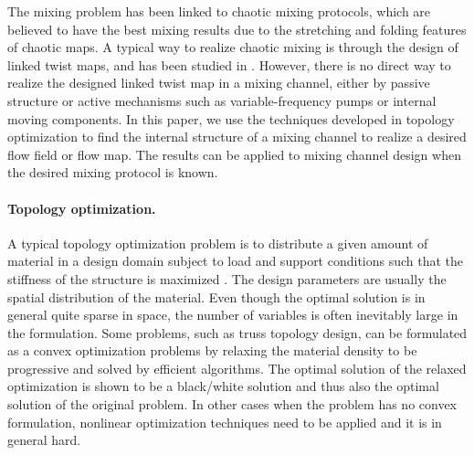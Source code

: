 The mixing problem has been linked to chaotic mixing protocols, which
are believed to have the best mixing results due to the stretching and
folding features of chaotic maps. A typical way to realize chaotic
mixing is through the design of linked twist maps, and has been
studied in \cite{Wiggins2004}. However, there is no direct way to
realize the designed linked twist map in a mixing channel, either by
passive structure or active mechanisms such as variable-frequency
pumps or internal moving components. In this paper, we use the
techniques developed in topology optimization to find the internal
structure of a mixing channel to realize a desired flow field or flow
map. The results can be applied to mixing channel design when the
desired mixing protocol is known.


\paragraph{Topology optimization.}
A typical topology optimization problem is to distribute a given amount of material in a design domain subject to load and support
conditions such that the stiffness of the structure is maximized \cite{Bendsoe2003}. The design parameters are usually the spatial
distribution of the material. Even though the optimal solution is in general quite sparse in space, the number of variables is often
inevitably large in the formulation. Some problems, such as truss topology design, can be formulated as a convex optimization
problems \cite{BenTal1997} by relaxing the material density to be progressive and solved by efficient algorithms. The optimal solution of
the relaxed optimization is shown to be a black/white solution and thus also the optimal solution of the original problem. In other cases
when the problem has no convex formulation, nonlinear optimization techniques need to be applied and it is in general hard.



